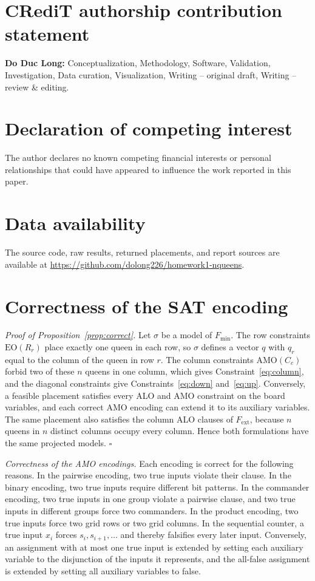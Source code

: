 \documentclass[a4paper,fleqn]{cas-sc}
\newcommand{\AMO}{\mathrm{AMO}}
\newcommand{\EO}{\mathrm{EO}}
\begin{document}
\section*{CRediT authorship contribution statement}
\textbf{Do Duc Long:} Conceptualization, Methodology, Software,
Validation, Investigation, Data curation, Visualization,
Writing -- original draft, Writing -- review \& editing.

\section*{Declaration of competing interest}
The author declares no known competing financial interests or personal
relationships that could have appeared to influence the work
reported in this paper.

\section*{Data availability}
The source code, raw results, returned placements, and report sources are
available at \url{https://github.com/dolong226/homework1-nqueens}.

\appendix
\section{Correctness of the SAT encoding}
\label{app:correct}
\textit{Proof of Proposition~\ref{prop:correct}.} Let $\sigma$ be a model of
$F_{\min}$. The row constraints $\EO(R_r)$ place exactly one queen in each
row, so $\sigma$ defines a vector $q$ with $q_r$ equal to the column of the
queen in row $r$. The column constraints $\AMO(C_c)$ forbid two of these
$n$ queens in one column, which gives Constraint~\eqref{eq:column}, and the
diagonal constraints give Constraints~\eqref{eq:down} and~\eqref{eq:up}.
Conversely, a feasible placement satisfies every ALO and AMO constraint
on the board variables, and each correct AMO encoding can extend it to
its auxiliary variables. The same placement also satisfies the column ALO
clauses of $F_{\mathrm{ext}}$, because $n$ queens in $n$ distinct columns
occupy every column. Hence both formulations have the same projected
models. \hfill$\square$

\textit{Correctness of the AMO encodings.} Each encoding is correct for
the following reasons. In the pairwise encoding, two true inputs violate
their clause. In the binary encoding, two true inputs require different
bit patterns. In the commander encoding, two true inputs in one group
violate a pairwise clause, and two true inputs in different groups force
two commanders. In the product encoding, two true inputs force two grid
rows or two grid columns. In the sequential counter, a true input $x_i$
forces $s_i,s_{i+1},\ldots$ and thereby falsifies every later input.
Conversely, an assignment with at most one true input is extended by
setting each auxiliary variable to the disjunction of the inputs it
represents, and the all-false assignment is extended by setting all
auxiliary variables to false.
\end{document}
